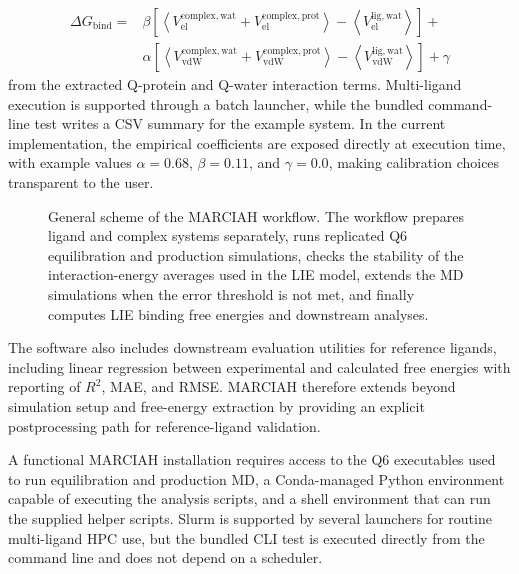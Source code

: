 \documentclass[journal=jcisd8,manuscript=article]{achemso}
\begin{document}
\begin{align}
\Delta G_{\mathrm{bind}} ={}& \beta \left[\left\langle V_{\mathrm{el}}^{\mathrm{complex,wat}} + V_{\mathrm{el}}^{\mathrm{complex,prot}}\right\rangle - \left\langle V_{\mathrm{el}}^{\mathrm{lig,wat}}\right\rangle\right] +\nonumber \\
& \alpha \left[\left\langle V_{\mathrm{vdW}}^{\mathrm{complex,wat}} + V_{\mathrm{vdW}}^{\mathrm{complex,prot}}\right\rangle - \left\langle V_{\mathrm{vdW}}^{\mathrm{lig,wat}}\right\rangle\right] +\gamma
\end{align}
from the extracted Q-protein and Q-water interaction terms. Multi-ligand execution is supported through a batch launcher, while the bundled command-line test writes a CSV summary for the example system. In the current implementation, the empirical coefficients are exposed directly at execution time, with example values \(\alpha = 0.68\), \(\beta = 0.11\), and \(\gamma = 0.0\), making calibration choices transparent to the user.

\begin{figure}[h]
\centering

\caption{General scheme of the MARCIAH workflow. The workflow prepares ligand and complex systems separately, runs replicated Q6 equilibration and production simulations, checks the stability of the interaction-energy averages used in the LIE model, extends the MD simulations when the error threshold is not met, and finally computes LIE binding free energies and downstream analyses.}
\label{fig:workflow}
\end{figure}

The software also includes downstream evaluation utilities for reference ligands, including linear regression between experimental and calculated free energies with reporting of \(R^2\), MAE, and RMSE. MARCIAH therefore extends beyond simulation setup and free-energy extraction by providing an explicit postprocessing path for reference-ligand validation.

A functional MARCIAH installation requires access to the Q6 executables used to run equilibration and production MD, a Conda-managed Python environment capable of executing the analysis scripts, and a shell environment that can run the supplied helper scripts. Slurm is supported by several launchers for routine multi-ligand HPC use, but the bundled CLI test is executed directly from the command line and does not depend on a scheduler.
\end{document}
